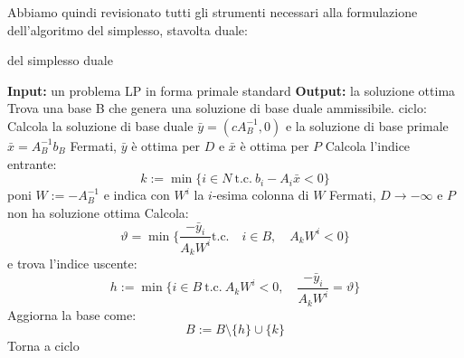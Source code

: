 \documentclass[a4paper,11pt]{article}
\begin{document}
Abbiamo quindi revisionato tutti gli strumenti necessari alla formulazione dell'algoritmo del simplesso, stavolta duale:
\begin{algorithm}[H]
\caption{del simplesso duale}
\begin{algorithmic}
	\STATE \textbf{Input:} un problema LP in forma primale standard
	\STATE \textbf{Output:} la soluzione ottima 
	\STATE Trova una base B che genera una soluzione di base duale ammissibile.
	\STATE \textsf{ciclo:}
	\STATE Calcola la soluzione di base duale $\bar{y} = (cA_B^{-1}, 0)$ e la soluzione di base primale $\bar{x} = A_B^{-1}b_B$
		\STATE Fermati, $\bar{y}$ è ottima per $D$ e $\bar{x}$ è ottima per $P$
	\ELSE
		\STATE Calcola l'indice entrante: 
		$$
		k := \min\{ i \in N \ \text{t.c.} \ b_i - A_i \bar{x} < 0 \}
		$$
		poni $W := -A_B^{-1}$ e indica con $W^i$ la $i$-esima colonna di $W$
	\ENDIF
		\STATE Fermati, $D \rightarrow -\infty$ e $P$ non ha soluzione ottima
	\ELSE
		\STATE Calcola:
		$$
		\vartheta = \min\{ \frac{-\bar{y}_i}{A_kW^i} \text{t.c.} \quad i \in B, \quad A_k W^i < 0 \}
		$$
		e trova l'indice uscente: 
		$$ 
		h := \min\{ i \in B \ \text{t.c.} \ A_k W^i < 0, \quad \frac{-\bar{y}_i}{A_kW^i} = \vartheta \}	
		$$
	\ENDIF
	\STATE Aggiorna la base come:
	$$
	B := B \setminus \{h\} \cup \{k\}
	$$
	\STATE Torna a \textsf{ciclo}
\end{algorithmic}
\end{algorithm}
\end{document}
